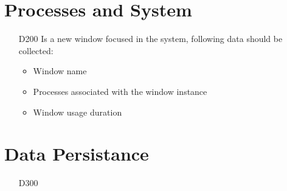 \section{Processes and System}
\begin{itemize}
\item[D200] Is a new window focused in the system, following data should be collected:
	\begin{itemize}
	\item Window name
	\item Processes associated with the window instance
	\item Window usage duration
	\end{itemize}
\end{itemize}

\section{Data Persistance}
\begin{itemize}
\item[D300]
\end{itemize}